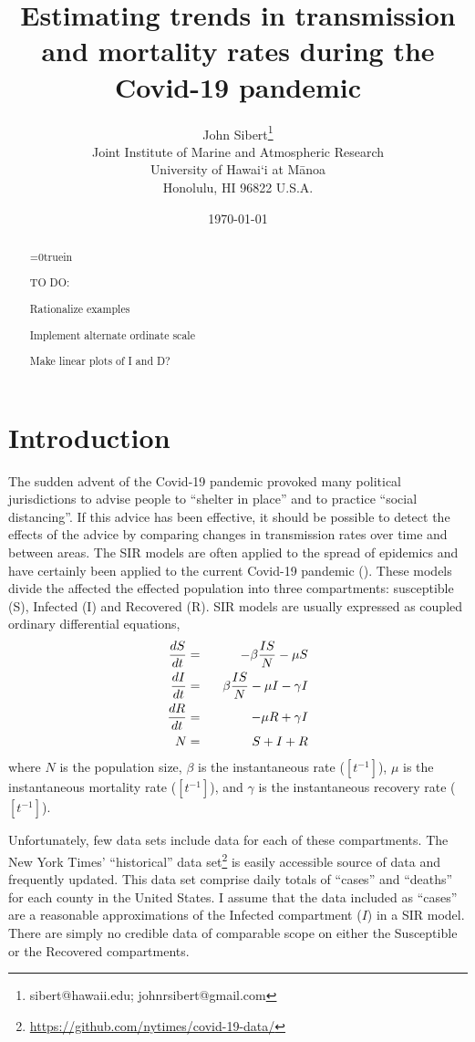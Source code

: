 \documentclass[12pt,letterpaper]{article}
\title{Estimating trends in transmission and mortality rates
during the Covid-19 pandemic}
\author{
John Sibert\thanks{sibert@hawaii.edu; johnrsibert@gmail.com}\\
Joint Institute of Marine and Atmospheric Research\\
University of Hawai`i at M\={a}noa\\
Honolulu, HI  96822 U.S.A.\\[0.125in]
\date{\today}
}
\newcommand\doublespacing{\baselineskip=1.6\normalbaselineskip}
\newcommand\help[1]{\color{Magenta}{\it #1 }\normalcolor}
\begin{document}
\maketitle

\doublespacing

\begin{abstract}

\centerline{\help{Write me}}

{\parindent=0truein

TO DO:

Rationalize examples

Implement alternate ordinate scale

Make linear plots of I and D?
}
\end{abstract}

\section*{Introduction}

The sudden advent of the Covid-19 pandemic provoked many political
jurisdictions to advise people to ``shelter in place'' and to practice
``social distancing''. If this advice has been effective, it should be
possible to detect the effects of the advice by comparing changes in
transmission rates over time and between areas. 
The SIR models are often applied to the spread of epidemics and have
certainly been applied to the current Covid-19 pandemic
(\cite{Chen2020,Roques2020}).
These models divide the affected the effected population into three compartments: 
susceptible (S), Infected (I) and Recovered (R).
SIR models are
usually expressed as coupled ordinary differential equations,
\begin{eqnarray}
\label{eqn:SIR}
\frac{dS}{dt} &=& -\beta\frac{IS}{N} - \mu S\\
\frac{dI}{dt} &=& \hphantom{-}\beta\frac{IS}{N} - \mu I -\gamma I\\
\frac{dR}{dt} &=&  -\mu R +\gamma I\\
N &=& S + I + R
\end{eqnarray}
where $N$ is the population size, $\beta$ is the instantaneous
rate ($[t^{-1}]$), $\mu$ is the instantaneous mortality rate
($[t^{-1}]$),
and $\gamma$ is the instantaneous recovery rate ($[t^{-1}]$).  


Unfortunately, few data sets include data for each of
these compartments. 
The New York Times' ``historical'' 
data set\footnote{\label{ff:nyt}\url{https://github.com/nytimes/covid-19-data/}}
is easily accessible source of data and frequently updated. This data
set comprise daily totals of ``cases'' and ``deaths'' for each county
in the United States. I assume that the data included as ``cases'' are
a reasonable approximations of the Infected compartment ($I$) in a SIR model. 
There are simply no credible data of comparable scope on either the Susceptible or
the Recovered compartments.
\end{document}
